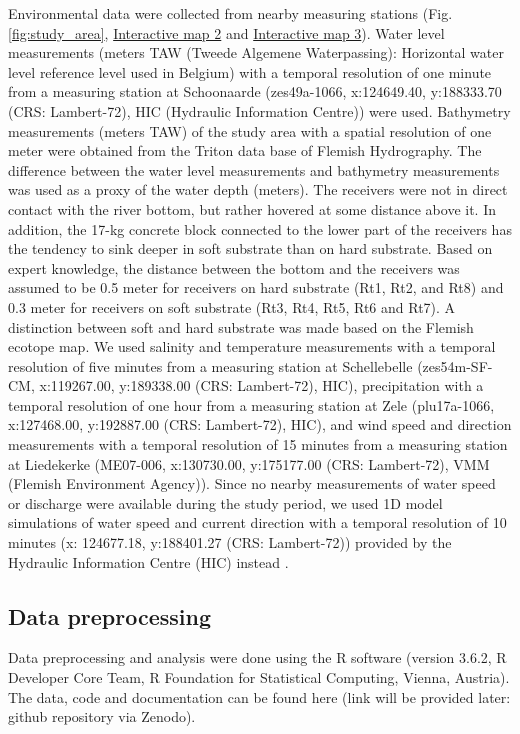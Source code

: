\documentclass[doublespacing,linenumbers]{bmcart}
\begin{document}
Environmental data were collected from nearby measuring stations (Fig. \ref{fig:study_area}, \href{http://rpubs.com/spbruneel/Env_loc_DR_ZS}{Interactive map 2} and \href{http://rpubs.com/spbruneel/Env_Rec_loc_DR_ZS}{Interactive map 3}). Water level measurements (meters TAW (Tweede Algemene Waterpassing): Horizontal water level reference level used in Belgium) with a temporal resolution of one minute from a measuring station at Schoonaarde (zes49a-1066, x:124649.40, y:188333.70 (CRS: Lambert-72), HIC (Hydraulic Information Centre)) were used. Bathymetry measurements (meters TAW) of the study area with a spatial resolution of one meter were obtained from the Triton data base of Flemish Hydrography. The difference between the water level measurements and bathymetry measurements was used as a proxy of the water depth (meters). The receivers were not in direct contact with the river bottom, but rather hovered at some distance above it. In addition, the 17-kg concrete block connected to the lower part of the receivers has the tendency to sink deeper in soft substrate than on hard substrate. Based on expert knowledge, the distance between the bottom and the receivers was assumed to be 0.5 meter for receivers on hard substrate (Rt1, Rt2, and Rt8) and 0.3 meter for receivers on soft substrate (Rt3, Rt4, Rt5, Rt6 and Rt7). A distinction between soft and hard substrate was made based on the Flemish ecotope map. We used salinity and temperature measurements with a temporal resolution of five minutes from a measuring station at Schellebelle (zes54m-SF-CM, x:119267.00, y:189338.00 (CRS: Lambert-72), HIC), precipitation with a temporal resolution of one hour from a measuring station at Zele (plu17a-1066, x:127468.00, y:192887.00 (CRS: Lambert-72), HIC), and wind speed and direction measurements with a temporal resolution of 15 minutes from a measuring station at Liedekerke (ME07-006, x:130730.00, y:175177.00 (CRS: Lambert-72), VMM (Flemish Environment Agency)). Since no nearby measurements of water speed or discharge were available during the study period, we used 1D model simulations of water speed and current direction with a temporal resolution of 10 minutes (x: 124677.18, y:188401.27 (CRS: Lambert-72)) provided by the Hydraulic Information Centre (HIC) instead \cite{Coen2020Numeriek2020}. 

\subsection*{Data preprocessing}

Data preprocessing and analysis were done using the R software (version 3.6.2, R Developer Core Team, R Foundation for Statistical Computing, Vienna, Austria). The data, code and documentation can be found here (link will be provided later: github repository via Zenodo).
\end{document}

